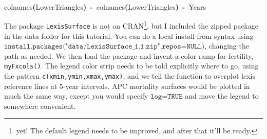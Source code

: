 \documentclass[a4paper]{article}
\newcommand{\hlfunctioncall}[1]{\textcolor[rgb]{1,0,0}{#1}}%
\newcommand{\hlkeyword}[1]{\textcolor[rgb]{0,0,0}{\textbf{#1}}}%
\newcommand{\hlassignement}[1]{\textcolor[rgb]{0.215686274509804,0.215686274509804,0.384313725490196}{\textbf{#1}}}%
\newcommand{\hlsymbol}[1]{\textcolor[rgb]{0,0,0}{#1}}%
\newcommand{\hlprompt}[1]{\textcolor[rgb]{0,0,0}{#1}}%
\newcommand{\hlstd}[1]{\textcolor[rgb]{0,0,0}{#1}}%
\newenvironment{Houtput}{\raggedright}{%
%
}
\begin{document}
\begin{Houtput}
\normalfont
\hspace*{\fill}\\
\hlstd{}\ttfamily\noindent
\hlprompt{\usebox{\hlnormalsizeboxgreaterthan}{\ }}\hlfunctioncall{colnames}\hlkeyword{(}\hlsymbol{LowerTriangles}\hlkeyword{)}{\ }\hlassignement{\usebox{\hlnormalsizeboxlessthan}-}{\ }\hlfunctioncall{colnames}\hlkeyword{(}\hlsymbol{LowerTriangles}\hlkeyword{)}{\ }\hlassignement{\usebox{\hlnormalsizeboxlessthan}-}{\ }\hlsymbol{Years}\mbox{}
\normalfont
\hspace*{\fill}\\
\hlstd{}
\end{Houtput}

The package \texttt{LexisSurface} is not on CRAN\footnote{yet! The default legend needs to be improved, and after that it'll be ready.}, but I included the zipped package in the data folder for this tutorial. You can do a local install from syntax using $\texttt{install.packages("data/LexisSurface\_1.1.zip",repos=NULL)}$, changing the path as needed. We then load the package and invent a color ramp for fertility, \texttt{myFxcols()}. The legend color strip needs to be told explicitly where to go, using the pattern \texttt{c(xmin,ymin,xmax,ymax)}, and we tell the function to overplot lexis reference lines at 5-year intervals. APC mortality surfaces would be plotted in much the same way, except you would specify $\texttt{log=TRUE}$ and move the legend to somewhere convenient.
\end{document}
